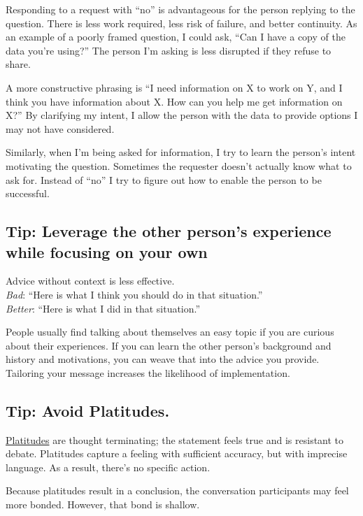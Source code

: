 Responding to a request with ``no'' is advantageous for the person replying to the question. There is less work required, less risk of failure, and better continuity. As an example of a poorly framed question, I could ask, ``Can I have a copy of the data you're using?'' The person I'm asking is less disrupted if they refuse to share. 

A more constructive phrasing is ``I need information on X to work on Y, and I think you have information about X. How can you help me get information on X?'' By clarifying my intent, I allow the person with the data to provide options I may not have considered.

Similarly, when I'm being asked for information, I try to learn the person's intent motivating the question. Sometimes the requester doesn't actually know what to ask for. Instead of ``no'' I try to figure out how to enable the person to be successful. 

\subsection*{Tip: Leverage the other person's experience while focusing on your own\label{sec:advice}}

Advice without context is less effective.\\
\textit{Bad}: ``Here is what I think you should do in that situation.''\\
\textit{Better}: ``Here is what I did in that situation.''

People usually find talking about themselves an easy topic if you are curious about their experiences. 
If you can learn the other person's background and history and motivations, you can weave that into the advice you provide. 
Tailoring your message increases the likelihood of implementation. 

\subsection*{Tip: Avoid Platitudes\label{sec:platitudes}.}
\href{https://en.wikipedia.org/wiki/Platitude}{Platitudes} are \gls{thought terminating}; the statement feels true and is resistant to debate. Platitudes capture a feeling with sufficient accuracy, but with imprecise language. As a result, there's no specific action.

Because platitudes result in a conclusion, the conversation participants may feel more bonded. However, that bond is shallow.

